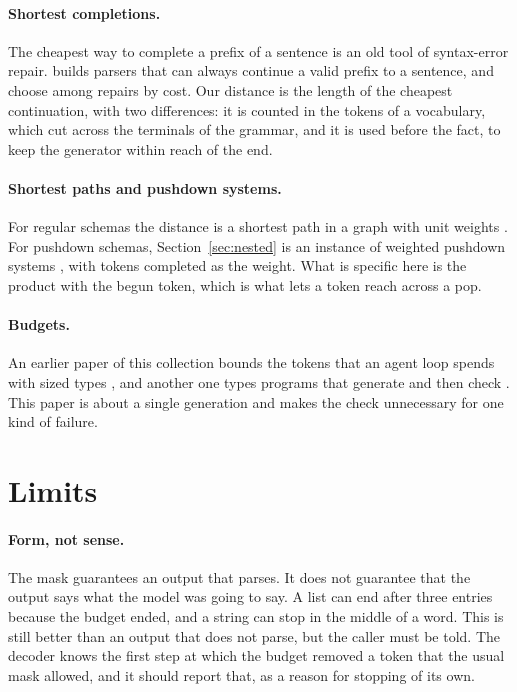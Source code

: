 \documentclass[acmsmall,nonacm,screen]{acmart}
\begin{document}
\paragraph{Shortest completions.} The cheapest way to complete a prefix of a sentence is an
old tool of syntax-error repair. \citet{Roehrich1980} builds parsers that can always
continue a valid prefix to a sentence, and \citet{BurkeFisher1987} choose among repairs by
cost. Our distance is the length of the cheapest continuation, with two differences: it is
counted in the tokens of a vocabulary, which cut across the terminals of the grammar, and it
is used before the fact, to keep the generator within reach of the end.

\paragraph{Shortest paths and pushdown systems.} For regular schemas the distance is a
shortest path in a graph with unit weights \citep{Dijkstra1959}. For pushdown schemas,
Section~\ref{sec:nested} is an instance of weighted pushdown systems \citep{Reps2005}, with
tokens completed as the weight. What is specific here is the product with the begun token,
which is what lets a token reach across a pop.

\paragraph{Budgets.} An earlier paper of this collection bounds the tokens that an agent
loop spends with sized types \citep{tpp6}, and another one types programs that generate and
then check \citep{tpp3}. This paper is about a single generation and makes the check
unnecessary for one kind of failure.

\section{Limits}\label{sec:limits}

\paragraph{Form, not sense.} The mask guarantees an output that parses. It does not
guarantee that the output says what the model was going to say. A list can end after three
entries because the budget ended, and a string can stop in the middle of a word. This is
still better than an output that does not parse, but the caller must be told. The decoder
knows the first step at which the budget removed a token that the usual mask allowed, and it
should report that, as a reason for stopping of its own.
\end{document}
